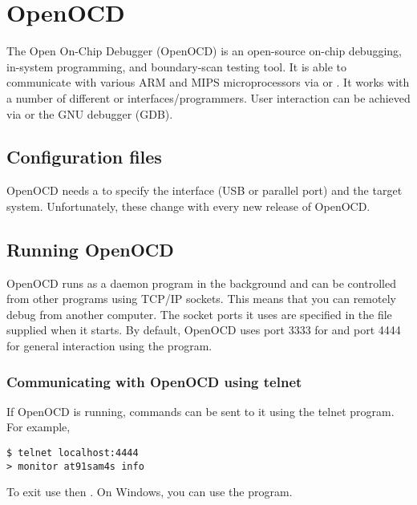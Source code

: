 \chapter{OpenOCD}
\label{OpenOCD}

The Open On-Chip Debugger (OpenOCD) is an open-source on-chip
debugging, in-system programming, and boundary-scan testing tool. It
is able to communicate with various ARM and MIPS microprocessors via
 or . It works with a number of
different  or 
interfaces/programmers. User interaction can be achieved via
 or the GNU debugger (GDB).


\section{Configuration files}
\label{configuration-files}

OpenOCD needs a  to
specify the interface (USB or parallel port) and the target system.
Unfortunately, these change with every new release of OpenOCD.


\section{Running OpenOCD}
\label{running-openocd}

OpenOCD runs as a daemon program in the background and can be
controlled from other programs using TCP/IP sockets. This means that
you can remotely debug from another computer. The socket ports it uses
are specified in the  file supplied when it starts. By default, OpenOCD
uses port 3333 for  and port 4444 for general
interaction using the  program.


\subsection{Communicating with OpenOCD using telnet}
\label{communicating-with-openocd-using-telnet}

If OpenOCD is running, commands can be sent to it using the telnet
program.  For example,
%
\begin{verbatim}
$ telnet localhost:4444
> monitor at91sam4s info
\end{verbatim}
%
To exit use \code{ctrl-]} then .  On Windows, you can use the
   program.


